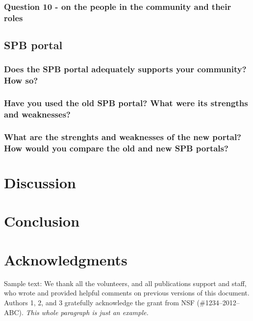 \documentclass{sigchi}
\begin{document}
\subsubsection{Question 10 - on the people in the community and their roles}


\subsection{SPB portal}

\subsubsection{Does the SPB portal adequately supports your community? How so?}
\subsubsection{Have you used the old SPB portal? What were its strengths and weaknesses?}
\subsubsection{What are the strenghts and weaknesses of the new portal? How would you compare the old and new SPB portals?}


\section{Discussion}

\section{Conclusion}

\section{Acknowledgments}

Sample text: We thank all the volunteers, and all publications support
and staff, who wrote and provided helpful comments on previous
versions of this document. Authors 1, 2, and 3 gratefully acknowledge
the grant from NSF (\#1234--2012--ABC). \textit{This whole paragraph is
  just an example.}


%
%
%
%
%
\balance{}



\end{document}
